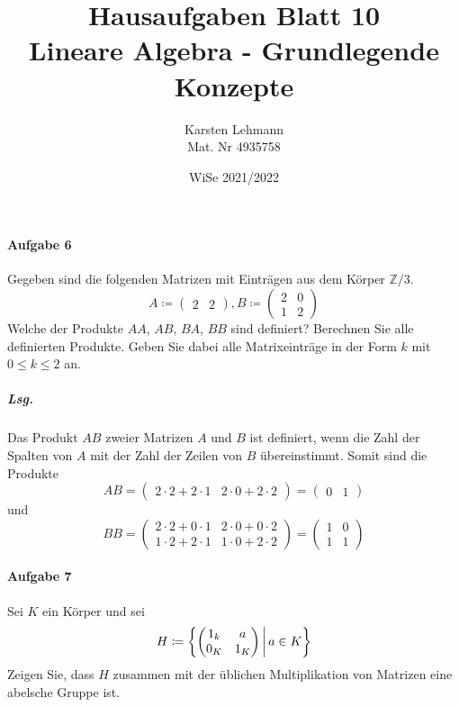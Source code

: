 \documentclass{scrreprt}
\author{Karsten Lehmann\\Mat. Nr 4935758}
\date{WiSe 2021/2022}
\title{Hausaufgaben Blatt 10\\Lineare Algebra - Grundlegende Konzepte}
\begin{document}
\paragraph{Aufgabe 6} Gegeben sind die folgenden Matrizen mit Einträgen aus
dem Körper $\mathbb{Z}/3$.
\[
  A \coloneqq \begin{pmatrix} 2 & 2 \end{pmatrix},
  B \coloneqq \begin{pmatrix} 2 & 0 \\ 1 & 2 \end{pmatrix}
\]
Welche der Produkte $AA$, $AB$, $BA$, $BB$ sind definiert?
Berechnen Sie alle definierten Produkte.
Geben Sie dabei alle Matrixeinträge in der Form $k$ mit $0 \leq k \leq 2$ an.

\subparagraph{Lsg.} Das Produkt $AB$ zweier Matrizen $A$ und $B$ ist definiert,
wenn die Zahl der Spalten von $A$ mit der Zahl der Zeilen von $B$ übereinstimmt.
Somit sind die Produkte
\[
  AB = \begin{pmatrix}
    2 \cdot 2 + 2 \cdot 1 & 2 \cdot 0 + 2 \cdot 2
  \end{pmatrix} = \begin{pmatrix} 0 & 1 \end{pmatrix}
\]
und
\[
  BB = \begin{pmatrix}
    2 \cdot 2 + 0 \cdot 1 & 2 \cdot 0 + 0 \cdot 2 \\
    1 \cdot 2 + 2 \cdot 1 & 1 \cdot 0 + 2 \cdot 2
  \end{pmatrix} = \begin{pmatrix} 1 & 0 \\ 1 & 1 \end{pmatrix}
\]

\paragraph{Aufgabe 7} Sei $K$ ein Körper und sei
\[
  H \coloneqq \qty{
    \begin{pmatrix}
      1_k & a \\
      0_K & 1_K
    \end{pmatrix}
    \,\middle|\,
    a \in K
  }
\]
Zeigen Sie, dass $H$ zusammen mit der üblichen Multiplikation von Matrizen eine
abelsche Gruppe ist.
\end{document}
